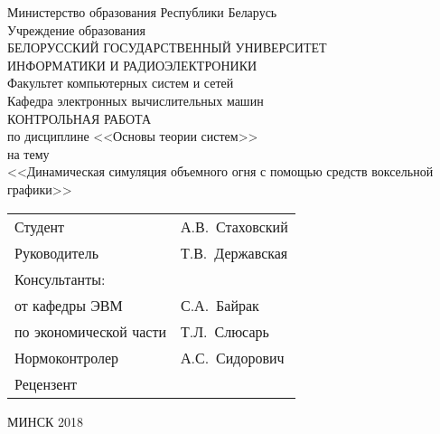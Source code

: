 \begin{titlepage}
  \begin{center}
    Министерство образования Республики Беларусь \\[1em]
    Учреждение образования \\
    БЕЛОРУССКИЙ ГОСУДАРСТВЕННЫЙ УНИВЕРСИТЕТ \\
    ИНФОРМАТИКИ И РАДИОЭЛЕКТРОНИКИ \\[1em]

    Факультет компьютерных систем и сетей \\ [1em]
    Кафедра электронных вычислительных машин \\[2em]

    {КОНТРОЛЬНАЯ РАБОТА}\\
    {по дисциплине <<Основы теории систем>>}\\
    {на тему}\\
    {<<Динамическая симуляция объемного огня с помощью средств воксельной
	  графики>>}\\[2em]


	  \begin{tabular}{>{\raggedright}p{}p{} }
      Студент & А.В.~Стаховский\\[1em]
      Руководитель & Т.В.~Державская \\[1em]
      Консультанты: &\\[1em]
      \hspace*{3ex}от кафедры ЭВМ & С.А.~Байрак \\[1em]
      \hspace*{3ex}по экономической части & Т.Л.~Слюсарь \\[1em]
      Нормоконтролер & А.С.~Сидорович\\[1em]
      Рецензент &
    \end{tabular}

    \vfill
    {\normalsize МИНСК 2018}
  \end{center}
\end{titlepage}
